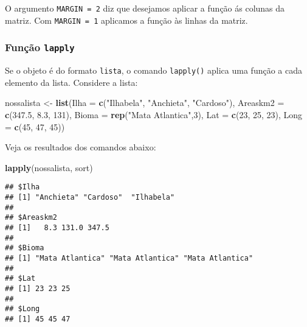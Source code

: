 \documentclass[
]{book}
\newenvironment{Shaded}{\begin{snugshade}}{\end{snugshade}}
\newcommand{\DataTypeTok}[1]{\textcolor[rgb]{0.13,0.29,0.53}{#1}}
\newcommand{\DecValTok}[1]{\textcolor[rgb]{0.00,0.00,0.81}{#1}}
\newcommand{\FloatTok}[1]{\textcolor[rgb]{0.00,0.00,0.81}{#1}}
\newcommand{\KeywordTok}[1]{\textcolor[rgb]{0.13,0.29,0.53}{\textbf{#1}}}
\newcommand{\NormalTok}[1]{#1}
\newcommand{\StringTok}[1]{\textcolor[rgb]{0.31,0.60,0.02}{#1}}
\begin{document}
O argumento \texttt{MARGIN\ =\ 2} diz que desejamos aplicar a função ás colunas da matriz. Com \texttt{MARGIN\ =\ 1} aplicamos a função às linhas da matriz.

\hypertarget{funuxe7uxe3o-lapply}{%
\subsubsection*{\texorpdfstring{Função \texttt{lapply}}{Função lapply}}\label{funuxe7uxe3o-lapply}}

Se o objeto é do formato \texttt{lista}, o comando \texttt{lapply()} aplica uma função a cada elemento da lista. Considere a lista:

\begin{Shaded}
\begin{Highlighting}[]
\NormalTok{nossalista <-}\StringTok{ }\KeywordTok{list}\NormalTok{(}\DataTypeTok{Ilha =} \KeywordTok{c}\NormalTok{(}\StringTok{"Ilhabela"}\NormalTok{, }\StringTok{"Anchieta"}\NormalTok{, }\StringTok{"Cardoso"}\NormalTok{), }
                  \DataTypeTok{Areaskm2 =} \KeywordTok{c}\NormalTok{(}\FloatTok{347.5}\NormalTok{, }\FloatTok{8.3}\NormalTok{, }\DecValTok{131}\NormalTok{), }
                  \DataTypeTok{Bioma =} \KeywordTok{rep}\NormalTok{(}\StringTok{"Mata Atlantica"}\NormalTok{,}\DecValTok{3}\NormalTok{),}
                  \DataTypeTok{Lat =} \KeywordTok{c}\NormalTok{(}\DecValTok{23}\NormalTok{, }\DecValTok{25}\NormalTok{, }\DecValTok{23}\NormalTok{),}
                  \DataTypeTok{Long =} \KeywordTok{c}\NormalTok{(}\DecValTok{45}\NormalTok{, }\DecValTok{47}\NormalTok{, }\DecValTok{45}\NormalTok{))}
\end{Highlighting}
\end{Shaded}

Veja os resultados dos comandos abaixo:

\begin{Shaded}
\begin{Highlighting}[]
\KeywordTok{lapply}\NormalTok{(nossalista, sort)}
\end{Highlighting}
\end{Shaded}

\begin{verbatim}
## $Ilha
## [1] "Anchieta" "Cardoso"  "Ilhabela"
## 
## $Areaskm2
## [1]   8.3 131.0 347.5
## 
## $Bioma
## [1] "Mata Atlantica" "Mata Atlantica" "Mata Atlantica"
## 
## $Lat
## [1] 23 23 25
## 
## $Long
## [1] 45 45 47
\end{verbatim}
\end{document}
